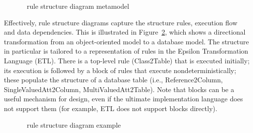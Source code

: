\begin{figure}[htbp]
\caption{\transml\ rule structure diagram metamodel \cite{GuerraLKPS13}}
\label{fig:transml-rulestructure}
\end{figure}

Effectively, rule structure diagrams capture the structure rules, execution flow and data dependencies. This is illustrated in Figure~\ref{fig:transml-rulestructure-example}, which shows a directional transformation from an object-oriented model to a database model. The structure in particular is tailored to a representation of rules in the Epsilon Transformation Language (ETL). There is a top-level rule (Class2Table) that is executed initially; its execution is followed by a block of rules that execute nondeterministically; these populate the structure of a database table (i.e., Reference2Column, SingleValuedAtt2Column, MultiValuedAtt2Table). Note that blocks can be a useful mechanism for design, even if the ultimate implementation language does not support them (for example, ETL does not support blocks directly).

\begin{figure}[htbp]
\caption{\transml\ rule structure diagram example \cite{GuerraLKPS13}}
\label{fig:transml-rulestructure-example}
\end{figure}


